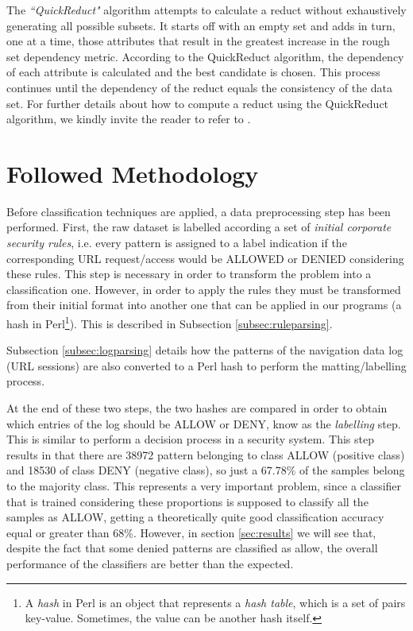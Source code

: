 \documentclass{llncs}
\begin{document}
The \emph{``QuickReduct"} algorithm  attempts to calculate a reduct without exhaustively generating all possible subsets. It starts off with an empty set and adds in turn, one at a time, those attributes that result in the greatest increase in the rough set dependency metric. According to the QuickReduct algorithm, the dependency of each attribute is calculated and the best candidate is chosen. This process continues until the dependency of the reduct equals the consistency of the data set.
For further details about how to compute a  reduct using the   QuickReduct algorithm, we kindly invite the reader to refer to  \cite{shen2007rough}.


%
\section{Followed Methodology}
\label{sec:methodology}

\noindent Before classification techniques are applied, a data preprocessing step has been performed. First, the raw dataset is labelled according a set of \textit{initial corporate security rules}, i.e. every pattern is assigned to a label indication if the corresponding URL request/access would be ALLOWED or DENIED considering these rules. This step is necessary in order to transform the problem into a classification one. However, in order to apply the rules they must be transformed from their initial format into another one that can be applied in our programs (a hash in Perl\footnote{A \textit{hash} in Perl is an object that represents a \textit{hash table}, which is a set of pairs key-value. Sometimes, the value can be another hash itself.}). This is described in Subsection \ref{subsec:ruleparsing}. 

Subsection \ref{subsec:logparsing} details how the patterns of the navigation data log (URL sessions) are also converted to a Perl hash to perform the matting/labelling process. 

At the end of these two steps, the two hashes are compared in order to obtain which entries of the log should be ALLOW or DENY, know as the \textit{labelling} step. This is similar to perform a decision process in a security system. This step results in that there are 38972 pattern belonging to class ALLOW (positive class) and 18530 of class DENY (negative class), so just a 67.78\% of the samples belong to the majority class. This represents a very important problem, since a classifier that is trained considering these proportions is supposed to classify all the samples as ALLOW, getting a theoretically quite good classification accuracy equal or greater than 68\%. However, in section \ref{sec:results} we will see that, despite the fact that some denied patterns are classified as allow, the overall performance of the classifiers are better than the expected.
\end{document}
